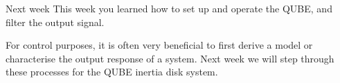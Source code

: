 \documentclass[9pt]{beamer-control}
\begin{document}
\begin{frame}{Next week}
	This week you learned how to set up and operate the QUBE, and filter the output signal.
	
	For control purposes, it is often very beneficial to first derive a model or characterise the output response of a system. Next week we will step through these processes for the QUBE inertia disk system.
\end{frame}
\end{document}
